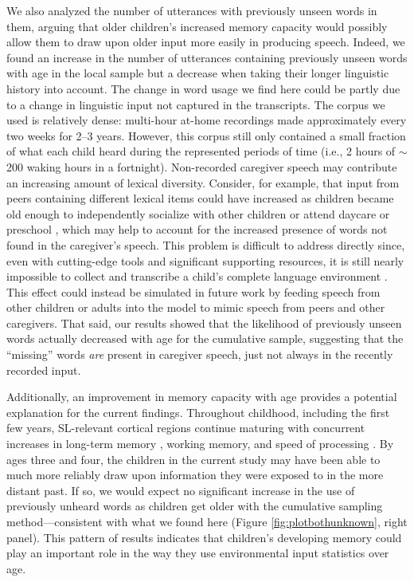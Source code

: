 \documentclass{article}
\begin{document}
We also analyzed the number of utterances with previously unseen words in them, arguing that older children's increased memory capacity \cite{bauer2005developments, gathercole2004structure, wojcik2013remembering} would possibly allow them to draw upon older input more easily in producing speech. Indeed, we found an increase in the number of utterances containing previously unseen words with age in the local sample but a decrease when taking their longer linguistic history into account. The change in word usage we find here could be partly due to a change in linguistic input not captured in the transcripts. The corpus we used is relatively dense: multi-hour at-home recordings made approximately every two weeks for 2--3 years. However, this corpus still only contained a small fraction of what each child heard during the represented periods of time (i.e., 2 hours of $\sim$200 waking hours in a fortnight). Non-recorded caregiver speech may contribute an increasing amount of lexical diversity. Consider, for example, that input from peers containing different lexical items could have increased as children became old enough to independently socialize with other children or attend daycare or preschool \cite{hoff2010context, hoff1991older, mannle1992twoyearolds}, which may help to account for the increased presence of words not found in the caregiver's speech. This problem is difficult to address directly since, even with cutting-edge tools and significant supporting resources, it is still nearly impossible to collect and transcribe a child's complete language environment \cite{casillasURstep, roy2009exploring}. This effect could instead be simulated in future work by feeding speech from other children or adults into the model to mimic speech from peers and other caregivers. That said, our results showed that the likelihood of previously unseen words actually decreased with age for the cumulative sample, suggesting that the ``missing'' words \textit{are} present in caregiver speech, just not always in the recently recorded input.

Additionally, an improvement in memory capacity with age provides a potential explanation for the current findings. Throughout childhood, including the first few years, SL-relevant cortical regions continue maturing \cite{casey2000structural, diamond2002normal, rodriguez2009neurophysiological, uylings2006development} with concurrent increases in long-term memory \cite{bauer2005developments, wojcik2013remembering}, working memory, and speed of processing \cite{gathercole2004structure, kail1991developmental}. By ages three and four, the children in the current study may have been able to much more reliably draw upon information they were exposed to in the more distant past. If so, we would expect no significant increase in the use of previously unheard words as children get older with the cumulative sampling method---consistent with what we found here (Figure \ref{fig:plotbothunknown}, right panel). This pattern of results indicates that children’s developing memory could play an important role in the way they use environmental input statistics over age.
\end{document}
